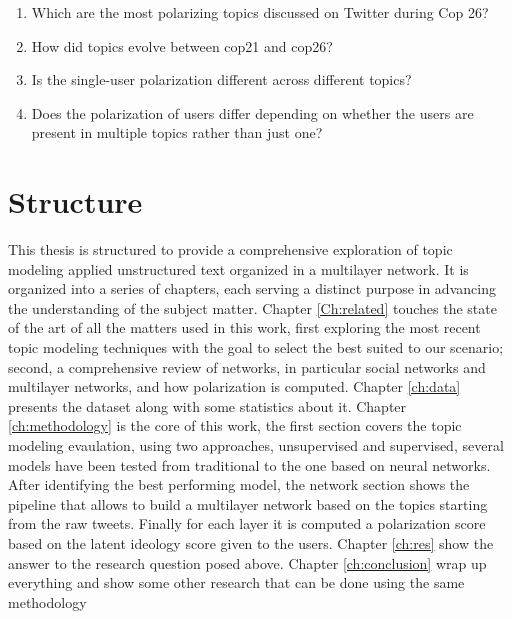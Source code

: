 \begin{enumerate}
    \item  Which are the most polarizing topics discussed on Twitter during Cop 26?
    \item How did topics evolve between cop21 and cop26?
    \item Is the single-user polarization different across different topics? 
    \item Does the polarization of users differ depending on whether the users are present in multiple topics rather than just one?


\end{enumerate}

\section{Structure}
This thesis is structured to provide a comprehensive exploration of  topic modeling applied unstructured text organized in a multilayer network. It is organized into a series of chapters, each serving a distinct purpose in advancing the understanding of the subject matter.  Chapter \ref{Ch:related} touches the state of the art of all the matters used in this work, first exploring the most recent topic modeling techniques with the goal to select the best suited to our scenario; second, a comprehensive review of networks, in particular social networks and multilayer networks, and how polarization is computed.
Chapter \ref{ch:data} presents the dataset along with some statistics about it.
Chapter \ref{ch:methodology} is the core of this work, the first section covers the topic modeling evaulation, using two approaches, unsupervised and supervised, several models have been tested from traditional to the one based on neural networks. After identifying the best performing model, the network section shows the pipeline that allows to build a multilayer network based on the topics starting from the raw tweets. Finally for each layer it is computed a polarization score based on the latent ideology score given to the users.
Chapter \ref{ch:res}  show the answer to the research question posed above.  Chapter \ref{ch:conclusion} wrap up everything and show some other research that can be done using the same methodology







